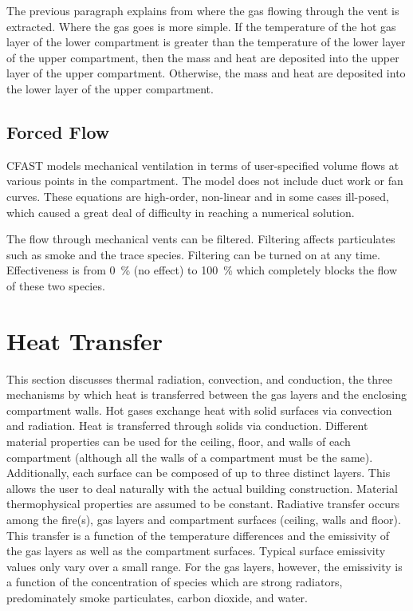 \documentclass[12pt,twoside]{book}
\begin{document}
The previous paragraph explains from where the gas flowing through the vent is extracted. Where the gas goes is more simple. If the temperature of the hot gas layer of the lower compartment is greater than the temperature of the lower layer of the upper compartment, then the mass and heat are deposited into the upper layer of the upper compartment. Otherwise, the mass and heat are deposited into the lower layer of the upper compartment.


\section{Forced Flow}

CFAST models mechanical ventilation in terms of user-specified volume flows at various points in the compartment. The model does not include duct work or fan curves. These equations are high-order, non-linear and in some cases ill-posed, which caused a great deal of difficulty in reaching a numerical solution.

The flow through mechanical vents can be filtered. Filtering affects particulates such as smoke and the trace species. Filtering can be turned on at any time. Effectiveness is from 0~\% (no effect) to 100~\% which completely blocks the flow of these two species.

%
%

\chapter{Heat Transfer}
\label{chap:heat_transfer}

This section discusses thermal radiation, convection, and conduction, the three mechanisms by which heat is transferred between the gas layers and the enclosing compartment walls. Hot gases exchange heat with solid surfaces via convection and radiation. Heat is transferred through solids via conduction. Different material properties can be used for the ceiling, floor, and walls of each compartment (although all the walls of a compartment must be the same).  Additionally, each surface can be composed of up to three distinct layers.  This allows the user to deal naturally with the actual building construction.  Material thermophysical properties are assumed to be constant. Radiative transfer occurs among the fire(s), gas layers and compartment surfaces (ceiling, walls and floor).  This transfer is a function of the temperature differences and the emissivity of the gas layers as well as the compartment surfaces.  Typical surface emissivity values only vary over a small range.  For the gas layers, however, the emissivity is a function of the concentration of species which are strong radiators, predominately smoke particulates, carbon dioxide, and water.
\end{document}
